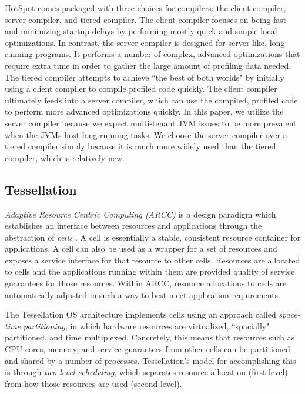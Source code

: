 \documentclass{sig-alternate}
\begin{document}
HotSpot comes packaged with three choices for compilers: the client compiler, server compiler, and tiered compiler. The client compiler focuses on being fast and minimizing startup delays by performing mostly quick and simple local optimizations. In contrast, the server compiler is designed for server-like, long-running programs. It performs a number of complex, advanced optimizations that require extra time in order to gather the large amount of profiling data needed. The tiered compiler attempts to achieve ``the best of both worlds" by initially using a client compiler to compile profiled code quickly. The client compiler ultimately feeds into a server compiler, which can use the compiled, profiled code to perform more advanced optimizations quickly. In this paper, we utilize the server compiler because we expect multi-tenant JVM issues to be more prevalent when the JVMs host long-running tasks. We choose the server compiler over a tiered compiler simply because it is much more widely used than the tiered compiler, which is relatively new.

\subsection{Tessellation}
\textit{Adaptive Resource Centric Computing (ARCC)} is a design paradigm which establishes an interface between resources and applications through the abstraction of \textit{cells} \cite{colmenares2013tessellation}. A cell is essentially a stable, consistent resource container for applications. A cell can also be used as a wrapper for a set of resources and exposes a service interface for that resource to other cells. Resources are allocated to cells and the applications running within them are provided quality of service guarantees for those resources. Within ARCC, resource allocations to cells are automatically adjusted in such a way to best meet application requirements.

The Tessellation OS architecture \cite{colmenares2010resource, colmenares2013tessellation, liu2009tessellation} implements cells using an approach called \textit{space-time partitioning}, in which hardware resources are virtualized, ``spacially" partitioned, and time multiplexed. Concretely, this means that resources such as CPU cores, memory, and service guarantees from other cells can be partitioned and shared by a number of processes. Tessellation's model for accomplishing this is through \textit{two-level scheduling}, which separates resource allocation (first level) from how those resources are used (second level).
\end{document}
